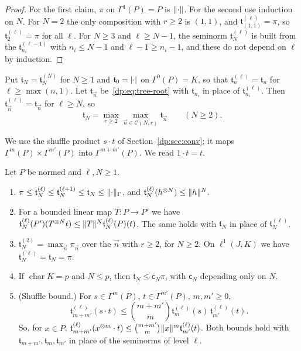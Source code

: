 \begin{proof}
For the first claim, $\pi$ on $\Gamma^1(P)=P$ is $\lVert \cdot\rVert$. For the second use induction on $N$. For $N=2$ the only composition with $r\ge2$ is $(1,1)$, and $\mathfrak t^{(\ell)}_{(1,1)}=\pi$, so $\mathfrak t^{(\ell)}_2=\pi$ for all $\ell$. For $N\ge3$ and $\ell\ge N-1$, the seminorm $\mathfrak t^{(\ell)}_N$ is built from the $\mathfrak t^{(\ell-1)}_{n_i}$ with $n_i\le N-1$ and $\ell-1\ge n_i-1$, and these do not depend on $\ell$ by induction.
\end{proof}

Put $\mathfrak t_N=\mathfrak t^{(N)}_N$ for $N\ge1$ and $\mathfrak t_0=\lvert \cdot\rvert$ on $\Gamma^0(P)=K$, so that $\mathfrak t^{(\ell)}_n=\mathfrak t_n$ for $\ell\ge\max(n,1)$. Let $\mathfrak t_{\vec n}$ be~\eqref{dp:eq:tree-root} with $\mathfrak t_{n_i}$ in place of $\mathfrak t^{(\ell)}_{n_i}$. Then $\mathfrak t^{(\ell)}_{\vec n}=\mathfrak t_{\vec n}$ for $\ell\ge N$, so
\begin{equation}\label{dp:eq:tree-fixed}
 \mathfrak t_N=\max_{r\ge2}\max_{\vec n\in\mathcal C(N,r)}\mathfrak t_{\vec n}\qquad(N\ge2).
\end{equation}

We use the shuffle product $s\cdot t$ of Section~\ref{dp:sec:conv}; it maps $\Gamma^m(P)\times\Gamma^{m'}(P)$ into $\Gamma^{m+m'}(P)$. We read $1\cdot t=t$.

\begin{lemma}\label{dp:lem:tree}
Let $P$ be normed and $\ell,N\ge1$.
\begin{enumerate}
\item $\pi\le\mathfrak t^{(\ell)}_N\le\mathfrak t^{(\ell+1)}_N\le\mathfrak t_N\le\lVert \cdot\rVert_\Gamma$, and $\mathfrak t^{(\ell)}_N(h^{\otimes N})\le\lVert h\rVert^N$.
\item For a bounded linear map $T\colon P\to P'$ we have $\mathfrak t^{(\ell)}_N(P')(T^{\otimes N}t)\le\lVert T\rVert^N\mathfrak t^{(\ell)}_N(P)(t)$. The same holds with $\mathfrak t_N$ in place of $\mathfrak t^{(\ell)}_N$.
\item $\mathfrak t^{(2)}_N=\max_{\vec n}\pi_{\vec n}$ over the $\vec n$ with $r\ge2$, for $N\ge2$. On $\ell^1(J,K)$ we have $\mathfrak t^{(\ell)}_N=\mathfrak t_N=\pi$.
\item If $\operatorname{char}K=p$ and $N\le p$, then $\mathfrak t_N\le\mathsf c_N\pi$, with $\mathsf c_N$ depending only on $N$.
\item \textup{(Shuffle bound.)} For $s\in\Gamma^m(P)$, $t\in\Gamma^{m'}(P)$, $m,m'\ge0$,
\begin{equation}\label{dp:eq:shuffle}
 \mathfrak t^{(\ell)}_{m+m'}(s\cdot t)\le\binom{m+m'}m\mathfrak t^{(\ell)}_m(s)\,\mathfrak t^{(\ell)}_{m'}(t).
\end{equation}
So, for $x\in P$, $\mathfrak t^{(\ell)}_{m+m'}(x^{\otimes m}\cdot t)\le\binom{m+m'}m\lVert x\rVert^m\mathfrak t^{(\ell)}_{m'}(t)$. Both bounds hold with $\mathfrak t_{m+m'},\mathfrak t_m,\mathfrak t_{m'}$ in place of the seminorms of level $\ell$.
\end{enumerate}
\end{lemma}

